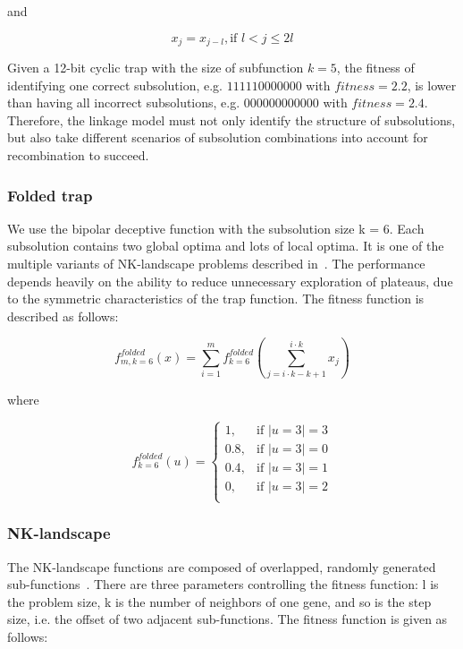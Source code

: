 \documentclass{sig-alternate-05-2015}
\begin{document}
and

\begin{displaymath}
x_j = x_{j-l}, \text{if } l < j \leq 2l
\end{displaymath}

Given a 12-bit cyclic trap with the size of subfunction $k = 5$, the fitness of identifying one correct subsolution, e.g. $111110000000$ with $fitness = 2.2$, is lower than having all incorrect subsolutions, e.g. $000000000000$ with $fitness = 2.4$. Therefore, the linkage model  must not only identify the structure of subsolutions, but also take different scenarios of subsolution combinations into account for recombination to succeed.


\subsubsection{Folded trap}
We use the bipolar deceptive function with the subsolution size k = 6. Each subsolution contains two global optima and lots of local optima. It is one of the multiple variants of NK-landscape problems described in~\cite{goldberg:deception}. The performance depends heavily on the ability to reduce unnecessary exploration of plateaus, due to the symmetric characteristics of the trap function.  The fitness function is described as follows:


\begin{displaymath}
f_{m,k=6}^{folded}(x) = \sum_{i=1}^{m} f_{k=6}^{folded} \left (\sum_{j = i\cdot k-k+1}^{i\cdot k} x_j\right )
\end{displaymath}

where

\begin{displaymath}
f_{k=6}^{folded}(u) = 
   \begin{cases}
    1, 		& \text{if $|u=3| = 3$} \\
    0.8, 	& \text{if $|u=3| = 0$} \\
    0.4, 	& \text{if $|u=3| = 1$} \\
    0, 		& \text{if $|u=3| = 2$} \\
	\end{cases}
\end{displaymath}


\subsubsection{NK-landscape}
The NK-landscape functions are composed of overlapped, randomly generated sub-functions~\cite{pelikan:overlap}. There are three parameters controlling the fitness function: l is the problem size, k is the number of neighbors of one gene, and so is the step size, i.e. the offset of two adjacent sub-functions. The fitness function is given as follows:
\end{document}
